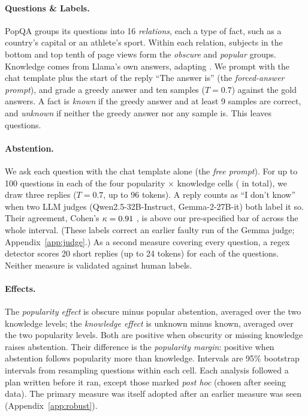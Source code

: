 \documentclass[11pt]{article}
\newcommand{\idk}{``I don't know''}
\begin{document}
\paragraph{Questions \& Labels.} PopQA \citep{mallen2023popqa} groups its questions into 16 \emph{relations}, each a type of fact, such as a country's capital or an athlete's sport. Within each relation, subjects in the bottom and top tenth of page views form the \emph{obscure} and \emph{popular} groups. Knowledge comes from Llama's own answers, adapting \citet{gekhman2024slick}. We prompt with the chat template plus the start of the reply ``The answer is'' (the \emph{forced-answer prompt}), and grade a greedy answer and ten samples ($T=0.7$) against the gold answers. A fact is \emph{known} if the greedy answer and at least 9 samples are correct, and \emph{unknown} if neither the greedy answer nor any sample is. This leaves \faLlamaN{} questions.

\paragraph{Abstention.} We ask each question with the chat template alone (the \emph{free prompt}). For up to 100 questions in each of the four popularity $\times$ knowledge cells (\hmLlamaItems{} in total), we draw three replies ($T=0.7$, up to 96 tokens). A reply counts as \idk{} when two LLM judges (Qwen2.5-32B-Instruct, Gemma-2-27B-it) both label it so. Their agreement, Cohen's $\kappa=0.91$ \lkKappaCI, is above our pre-specified bar of \kappaBar{} across the whole interval. (These labels correct an earlier faulty run of the Gemma judge; Appendix~\ref{app:judge}.) As a second measure covering every question, a regex detector scores 20 short replies (up to 24 tokens) for each of the \faLlamaN{} questions. Neither measure is validated against human labels.

\paragraph{Effects.} The \emph{popularity effect} is obscure minus popular abstention, averaged over the two knowledge levels; the \emph{knowledge effect} is unknown minus known, averaged over the two popularity levels. Both are positive when obscurity or missing knowledge raises abstention. Their difference is the \emph{popularity margin}: positive when abstention follows popularity more than knowledge. Intervals are 95\% bootstrap intervals from resampling questions within each cell. Each analysis followed a plan written before it ran, except those marked \emph{post hoc} (chosen after seeing data). The primary measure was itself adopted after an earlier measure was seen (Appendix~\ref{app:robust}).
\end{document}

